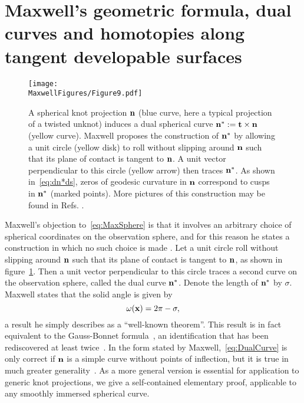     \section{Maxwell's geometric formula, dual curves and homotopies along tangent developable surfaces }
    \label{sec:GaussBonnet}
    \begin{figure}
        \centering
        \texttt{[image: \\MaxwellFigures/Figure9.pdf]}
        \caption{A spherical knot projection $\bf n$ (blue curve, here a typical projection of a twisted unknot) induces a dual spherical curve ${\bf n}^* := {\bf t} \times {\bf n}$ (yellow curve). Maxwell proposes the construction of ${\bf n}^*$ by allowing a unit circle (yellow disk) to roll without slipping around $\bf n$ such that its plane of contact is tangent to $\bf n$. A unit vector perpendicular to this circle (yellow arrow) then traces ${\bf n}^*$. As shown in~\eqref{eq:dn*ds}, zeros of geodesic curvature in $\bf n$ correspond to cusps in $\bf n^*$ (marked points). More pictures of this construction may be found in Refs. \citep{Levi1994,Arnold1995}.   }
        \label{fig:DualCurve} 
    \end{figure}
    Maxwell's objection to~\eqref{eq:MaxSphere} is that it involves an arbitrary choice of spherical coordinates on the observation sphere, and for this reason he states a construction in which no such choice is made \citep[Art.~418]{Maxwell2}. Let a unit circle roll without slipping around ${\bf n}$ such that its plane of contact is tangent to $\bf n$, as shown in figure~\ref{fig:DualCurve}. Then a unit vector perpendicular to this circle traces a second curve on the observation sphere, called the dual curve ${\bf n}^*$. Denote the length of ${\bf n}^*$ by $\sigma$. Maxwell states that the solid angle is given by 
    \begin{equation}
        \omega({\bf x}) = 2\pi - \sigma ,
        \label{eq:DualCurve}
    \end{equation}
    a result he simply describes as a ``well-known theorem''. This result is in fact equivalent to the Gauss-Bonnet formula~\citep{Lee1996}, an identification that has been rediscovered at least twice~\citep{Levi1994,Arnold1995}. In the form stated by Maxwell,~\eqref{eq:DualCurve} is only correct if ${\bf n}$ is a simple curve without points of inflection, but it is true in much greater generality~\citep{Arnold1995}. As a more general version is essential for application to generic knot projections, we give a self-contained elementary proof, applicable to any smoothly immersed spherical curve. 

